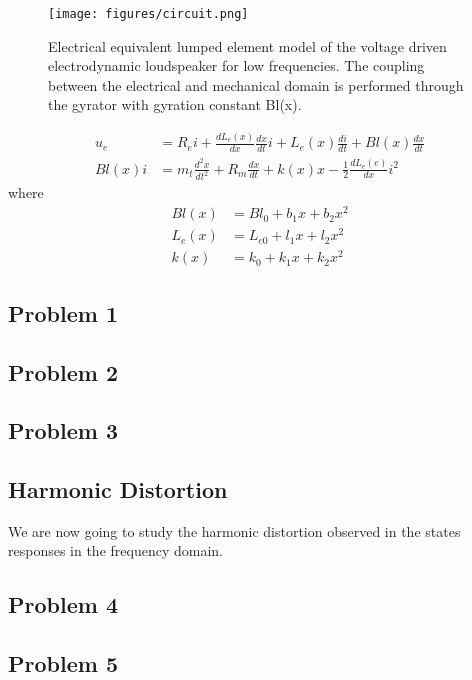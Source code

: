 \documentclass[12pt,a4paper,fleqn, onesside]{report}
\begin{document}
\begin{figure}[H]
\texttt{[image: figures/circuit.png]}
\caption{Electrical equivalent lumped element model of the voltage driven electrodynamic loudspeaker for low frequencies. The coupling between the electrical and mechanical domain is performed through the gyrator with gyration constant Bl(x).}
\label{circuit}
\end{figure}

\begin{align} 
  u_e &= R_ei+\frac{dL_e(x)}{dx}\frac{dx}{dt}i+L_e(x)\frac{di}{dt}+Bl(x)\frac{dx}{dt} \label{eq:1.1} \\     
  Bl(x)i &= m_t\frac{d^2x}{dt^2}+R_m\frac{dx}{dt}+k(x)x-\frac{1}{2}\frac{dL_e(e)}{dx}i^2 \label{eq:1.2}
\end{align}
where
\begin{align}
  Bl(x) &= Bl_0+b_1x+b_2x^2 \label{eq:1.3}  \\
  L_e(x) &= L_{e0}+l_1x+l_2x^2 \label{eq:1.4}  \\
  k(x) &= k_0+k_1x+k_2x^2 \label{eq:1.5} 
\end{align}

\subsection*{Problem 1}

\subsection*{Problem 2}

\subsection*{Problem 3}


\subsection{Harmonic Distortion}
We are now going to study the harmonic distortion observed in the states responses in the frequency domain. 
\subsection*{Problem 4}

\subsection*{Problem 5}

\end{document}
